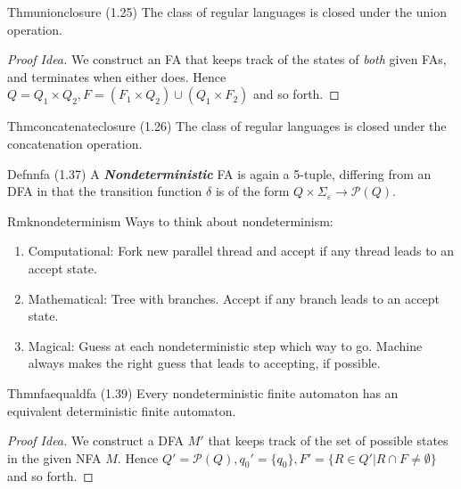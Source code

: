 \begin{reference}{Thm}{unionclosure}
  (1.25) The class of regular languages is closed under the union operation.
\end{reference}

\begin{proof}[Proof Idea]
  We construct an FA that keeps track of the states of \textit{both} given FAs, and terminates when either does. Hence $Q=Q_1\times Q_2, F=(F_1\times Q_2)\cup(Q_1\times F_2)$ and so forth.
\end{proof}

\begin{reference}{Thm}{concatenateclosure}
  (1.26) The class of regular languages is closed under the concatenation operation.
\end{reference}

\begin{reference}{Defn}{nfa}
  (1.37) A \textbf{\textit{Nondeterministic}} FA is again a 5-tuple, differing from an DFA in that the transition function $\delta$ is of the form $Q\times \Sigma_{\varepsilon}\rightarrow \mathcal{P}(Q)$.
\end{reference}

\begin{reference}{Rmk}{nondeterminism}
  Ways to think about nondeterminism:
  \begin{enumerate}
    \item Computational: Fork new parallel thread and accept if any thread leads to an accept state.
    \item Mathematical: Tree with branches. Accept if any branch leads to an accept state.
    \item Magical: Guess at each nondeterministic step which way to go. Machine always makes the right guess that leads to accepting, if possible.\qedhere
  \end{enumerate}
\end{reference}

\begin{reference}{Thm}{nfaequaldfa}
  (1.39) Every nondeterministic finite automaton has an equivalent deterministic finite automaton.
\end{reference}

\begin{proof}[Proof Idea]
  We construct a DFA $M'$ that keeps track of the set of possible states in the given NFA $M$. Hence $Q'=\mathcal{P}(Q), q_0'=\{q_0\}, F'=\{R\in Q'|R\cap F\neq\emptyset\}$ and so forth.
\end{proof}

